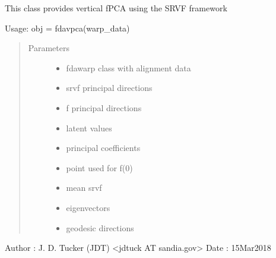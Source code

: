 \documentclass[letterpaper,10pt,english]{sphinxmanual}
\begin{document}
\begin{fulllineitems}
\label{\detokenize{fPCA:fPCA.fdavpca}}
This class provides vertical fPCA using the
SRVF framework

Usage:  obj = fdavpca(warp\_data)
\begin{quote}\begin{description}
\item[{Parameters}] \leavevmode\begin{itemize}
\item {} 
 \textendash{} fdawarp class with alignment data

\item {} 
 \textendash{} srvf principal directions

\item {} 
 \textendash{} f principal directions

\item {} 
 \textendash{} latent values

\item {} 
 \textendash{} principal coefficients

\item {} 
 \textendash{} point used for f(0)

\item {} 
 \textendash{} mean srvf

\item {} 
 \textendash{} eigenvectors

\item {} 
 \textendash{} geodesic directions

\end{itemize}

\end{description}\end{quote}

Author :  J. D. Tucker (JDT) \textless{}jdtuck AT sandia.gov\textgreater{}
Date   :  15\sphinxhyphen{}Mar\sphinxhyphen{}2018


\end{fulllineitems}
\end{document}
